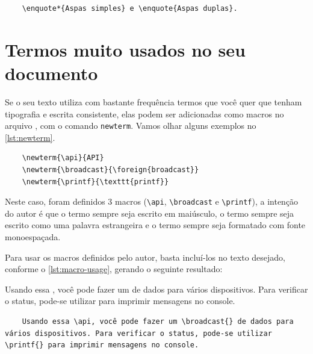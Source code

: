 \begin{listing}[htb]
  \begin{verbatim}
    \enquote*{Aspas simples} e \enquote{Aspas duplas}.
  \end{verbatim}
  \caption{Uso do pacote csquotes}
  \label{lst:csquotes}
\end{listing}

\section{Termos muito usados no seu documento}

Se o seu texto utiliza com bastante frequência termos que você quer que tenham tipografia e escrita consistente, elas podem ser adicionadas como macros no arquivo \macrofile, com o comando \texttt{newterm}. Vamos olhar alguns exemplos no \autoref{lst:newterm}.

\begin{listing}[htb]
  \begin{verbatim}
    \newterm{\api}{API}
    \newterm{\broadcast}{\foreign{broadcast}}
    \newterm{\printf}{\texttt{printf}}
  \end{verbatim}
  \caption{Definição de macros}
  \label{lst:newterm}
\end{listing}

Neste caso, foram definidos 3 macros (\texttt{\textbackslash{}api}, \texttt{\textbackslash{}broadcast} e \texttt{\textbackslash{}printf}), a intenção do autor é que o termo \api{} sempre seja escrito em maiúsculo, o termo \broadcast{} sempre seja escrito como uma palavra estrangeira e o termo \printf{} sempre seja formatado com fonte monoespaçada.

Para usar os macros definidos pelo autor, basta incluí-los no texto desejado, conforme o \autoref{lst:macro-usage}, gerando o seguinte resultado:

Usando essa \api, você pode fazer um \broadcast{} de dados para vários dispositivos. Para verificar o status, pode-se utilizar \printf{} para imprimir mensagens no console.

\begin{listing}[htb]
  \begin{verbatim}
    Usando essa \api, você pode fazer um \broadcast{} de dados para vários dispositivos. Para verificar o status, pode-se utilizar \printf{} para imprimir mensagens no console.
  \end{verbatim}
  \caption{Uso de macros}
  \label{lst:macro-usage}
\end{listing}

